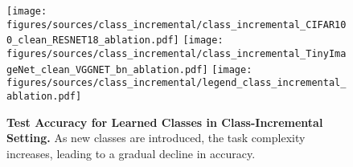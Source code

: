

\begin{figure}[h]
    \centering
    \texttt{[image: figures/sources/class\_incremental/class\_incremental\_CIFAR100\_clean\_RESNET18\_ablation.pdf]}
    \texttt{[image: figures/sources/class\_incremental/class\_incremental\_TinyImageNet\_clean\_VGGNET\_bn\_ablation.pdf]}
    \texttt{[image: figures/sources/class\_incremental/legend\_class\_incremental\_ablation.pdf]}
    
    \caption{\textbf{Test Accuracy for Learned Classes in Class-Incremental Setting.} As new classes are introduced, the task complexity increases, leading to a gradual decline in accuracy.}
    
    \label{exp_class_incremental_ablation}
\end{figure}

